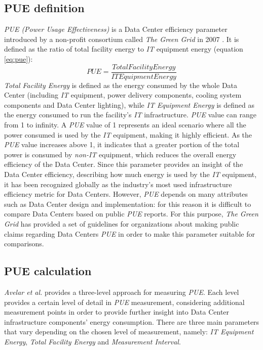 \subsection{PUE definition}
\emph{PUE (Power Usage Effectiveness)} is a Data Center efficiency parameter introduced by a non-profit consortium called \emph{The Green Grid} in 2007 \cite{avelar2012pue}. It is defined as the ratio of total facility energy to \emph{IT} equipment energy (equation \ref{eq:pue}):
\begin{equation} \label{eq:pue}
    PUE = \frac{Total Facility Energy}{IT Equipment Energy}
\end{equation}
\emph{Total Facility Energy} is defined as the energy consumed by the whole Data Center (including \emph{IT} equipment, power delivery components, cooling system components and Data Center lighting), while \emph{IT Equipment Energy} is defined as the energy consumed to run the facility's \emph{IT} infrastructure. \emph{PUE} value can range from 1 to infinity. A \emph{PUE} value of 1 represents an ideal scenario where all the power consumed is used by the \emph{IT} equipment, making it highly efficient. As the \emph{PUE} value increases above 1, it indicates that a greater portion of the total power is consumed by \emph{non-IT} equipment, which reduces the overall energy efficiency of the Data Center. Since this parameter provides an insight of the Data Center efficiency, describing how much energy is used by the \emph{IT} equipment, it has been recognized globally as the industry's most used infrastructure efficiency metric for Data Centers. However, \emph{PUE} depends on many attributes such as Data Center design and implementation: for this reason it is difficult to compare Data Centers based on public \emph{PUE} reports. For this purpose, \emph{The Green Grid} has provided a set of guidelines for organizations about making public claims regarding Data Centers \emph{PUE} in order to make this parameter suitable for comparisons.

\subsection{PUE calculation} \label{subsection:puecalculation}
\emph{Avelar et al.} \cite{avelar2012pue} provides a three-level approach for measuring \emph{PUE}. Each level provides a certain level of detail in \emph{PUE} measurement, considering additional measurement points in order to provide further insight into Data Center infrastructure components' energy consumption. There are three main parameters that vary depending on the chosen level of measurement, namely: \emph{IT Equipment Energy}, \emph{Total Facility Energy} and \emph{Measurement Interval}. 

